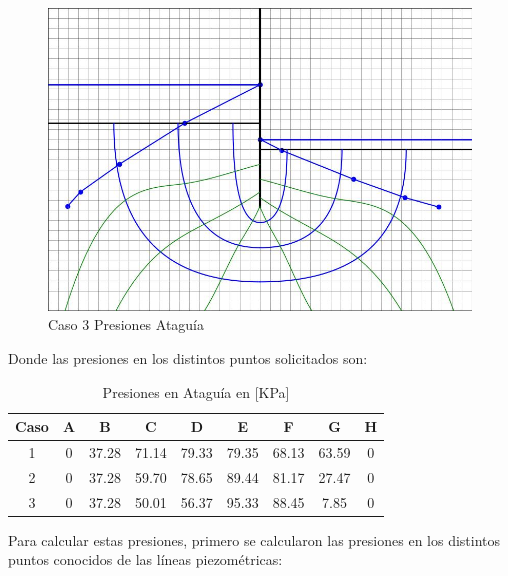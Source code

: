\begin{figure}[H]
\begin{minipage}{0.32\textwidth}
      \includegraphics[width=\textwidth]{FOTOS/caso_3_presion_ataquia_total.jpg}
      \caption{Caso 3 Presiones Ataguía}
  \end{minipage}
\end{figure}

Donde las presiones en los distintos puntos solicitados son:

\begin{table}[H]
  \centering
  \begin{tabular}{|c|c|c|c|c|c|c|c|c|}
    \hline
    Caso & A & B & C & D & E & F & G & H \\
    \hline
    1 & 0 & 37.28 & 71.14 & 79.33 & 79.35 & 68.13 & 63.59 & 0 \\ \hline
    2 & 0 & 37.28 & 59.70 & 78.65 & 89.44 & 81.17 & 27.47 & 0 \\ \hline
    3 & 0 & 37.28 & 50.01 & 56.37 & 95.33 & 88.45 & 7.85 & 0 \\
    \hline
  \end{tabular}
  \caption{Presiones en Ataguía en [KPa]}
\end{table}

Para calcular estas presiones, primero se calcularon las presiones en los distintos puntos conocidos de las líneas piezométricas:

